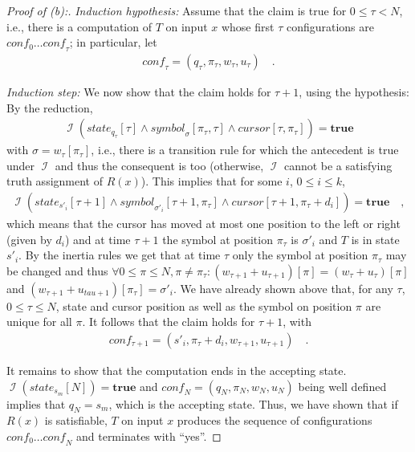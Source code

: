 \documentclass [11pt]{article}
\newcommand{\sym}[3]{\textit{symbol}_{#1}[#2,#3]}
\newcommand{\cursor}[2]{\textit{cursor}[#1,#2]}
\newcommand{\state}[2]{\textit{state}_{#1}[#2]}
\newcommand{\conf}{\textit{conf}}
\newcommand{\conft}{\ensuremath{\conf_{\tau}}}
\newcommand{\pt}{\ensuremath{\pi_{\tau}}}
\newcommand{\qt}{\ensuremath{q_{\tau}}}
\newcommand{\wt}{\ensuremath{w_{\tau}}}
\newcommand{\ut}{\ensuremath{u_{\tau}}}
\DeclareMathOperator{\II}{\mathcal{I}}
\newcommand{\True}{\mathbf{true}}
\begin{document}
\begin{proof}[Proof of (b):]
\noindent
\emph{Induction hypothesis:} Assume that the claim is true for $0\leq \tau < N$, i.e., there is a computation of $T$ on input $x$ whose first $\tau$ configurations are $conf_0\dots \conft$; in particular, let
\begin{align*}
\conft = (\qt, \pt, \wt, \ut) \quad .
\end{align*}

\noindent
\emph{Induction step:} We now show that the claim holds for $\tau+1$, using the hypothesis: By the reduction,
\begin{align*}
 \II(\state{\qt}{\tau}\land \sym{\sigma}{\pt}{\tau} \land \cursor{\tau}{\pt}) = \True
\end{align*}
with $\sigma = \wt[\pt]$, i.e., there is a transition rule for which the antecedent is true under $\II$ and thus the consequent is too (otherwise, $\II$ cannot be a satisfying truth assignment of $R(x)$).
This implies that for some $i$, $0 \leq i \leq k$,
\begin{align*}
 \II({\state{s'_i}{\tau+1}}\wedge 
\sym{\sigma'_i}{\tau+1}{\pt} \wedge {\cursor{\tau+1}{\pt+d_i}}) = \True \quad ,
\end{align*}
which means that the cursor has moved at most one position to the left or right (given by $d_i$) and at time $\tau+1$ the symbol at position $\pt$ is $\sigma'_i$ and $T$ is in state $s'_i$.
By the inertia rules we get that at time $\tau$ only the symbol at position $\pt$ may be changed and thus $\forall 0 \leq \pi \leq N, \pi \neq \pt: (w_{\tau+1} + u_{\tau+1})[\pi] = (\wt + \ut)[\pi]$ and $(w_{\tau+1} + u_{tau+1})[\pt] = \sigma'_i$.
We have already shown above that, for any $\tau$, $0\leq \tau \leq N$, state and cursor position as well as the symbol on position $\pi$ are unique for all $\pi$.
It follows that the claim holds for $\tau+1$, with
\begin{align*}
 conf_{\tau+1} = (s'_i, \pt+d_i, w_{\tau+1}, u_{\tau+1}) \quad .
\end{align*}

It remains to show that the computation ends in the accepting state.
 $\II(\state{s_m}{N}) = \True$ and $\conf_N=(q_N, \pi_N, w_N, u_N)$ being well defined implies that $q_N = s_m$, which is the accepting state. 
 Thus, we have shown that if $R(x)$ is satisfiable, $T$ on input $x$ produces the sequence of configurations $conf_0\dots \conf_N$ and terminates with ``yes''.


\end{proof}


\bigskip
\end{document}
